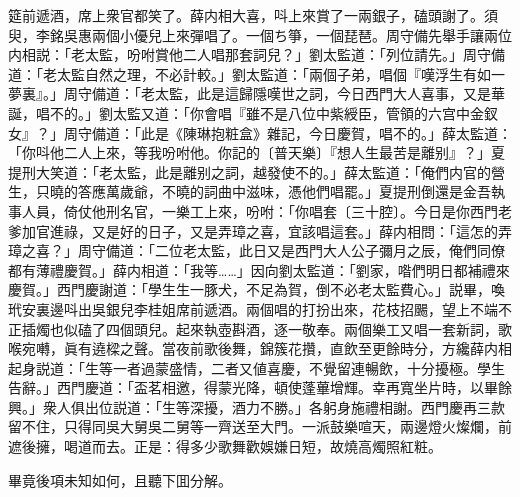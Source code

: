 筵前遞酒，席上衆官都笑了。薛内相大喜，呌上來賞了一兩銀子，磕頭謝了。須臾，李銘吳惠兩個小優兒上來彈唱了。一個ち箏，一個琵琶。周守備先舉手讓兩位内相説：「老太監，吩咐賞他二人唱那套詞兒？」劉太監道：「列位請先。」周守備道：「老太監自然之理，不必計較。」劉太監道：「兩個子弟，唱個『嘆浮生有如一夢裏』。」周守備道：「老太監，此是這歸隱嘆世之詞，今日西門大人喜事，又是華誕，唱不的。」劉太監又道：「你會唱『雖不是八位中紫綬臣，管領的六宫中金釵女』？」周守備道：「此是《陳琳抱粧盒》雜記，今日慶賀，唱不的。」薛太監道：「你呌他二人上來，等我吩咐他。你記的〔普天樂〕『想人生最苦是離别』？」夏提刑大笑道：「老太監，此是離别之詞，越發使不的。」薛太監道：「俺們内官的營生，只曉的答應萬歲爺，不曉的詞曲中滋味，憑他們唱罷。」夏提刑倒還是金吾執事人員，倚仗他刑名官，一樂工上來，吩咐：「你唱套〔三十腔〕。今日是你西門老爹加官進祿，又是好的日子，又是弄璋之喜，宜該唱這套。」薛内相問：「這怎的弄璋之喜？」周守備道：「二位老太監，此日又是西門大人公子彌月之辰，俺們同僚都有薄禮慶賀。」薛内相道：「我等……」因向劉太監道：「劉家，喒們明日都補禮來慶賀。」西門慶謝道：「學生生一豚犬，不足為賀，倒不必老太監費心。」説畢，喚玳安裏邊呌出吳銀兒李桂姐席前遞酒。兩個唱的打扮出來，花枝招颺，望上不端不正插燭也似磕了四個頭兒。起來執壺斟酒，逐一敬奉。兩個樂工又唱一套新詞，歌喉宛囀，眞有遶樑之聲。當夜前歌後舞，錦簇花攢，直飲至更餘時分，方纔薛内相起身説道：「生等一者過蒙盛情，二者又値喜慶，不覺留連暢飲，十分擾極。學生告辭。」西門慶道：「盃茗相邀，得蒙光降，頓使蓬蓽增輝。幸再寬坐片時，以畢餘興。」衆人俱出位説道：「生等深擾，酒力不勝。」各躬身施禮相謝。西門慶再三款留不住，只得同吳大舅吳二舅等一齊送至大門。一派鼓樂喧天，兩邊燈火燦爛，前遮後擁，喝道而去。正是：得多少歌舞歡娛嫌日短，故燒高燭照紅粧。

畢竟後項未知如何，且聽下囬分解。

